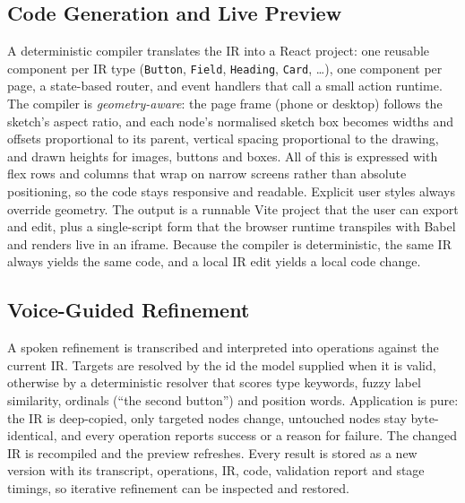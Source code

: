 \subsection{Code Generation and Live Preview}
A deterministic compiler translates the IR into a React project: one reusable component per IR type (\texttt{Button}, \texttt{Field}, \texttt{Heading}, \texttt{Card}, \dots), one component per page, a state-based router, and event handlers that call a small action runtime. The compiler is \emph{geometry-aware}: the page frame (phone or desktop) follows the sketch's aspect ratio, and each node's normalised sketch box becomes widths and offsets proportional to its parent, vertical spacing proportional to the drawing, and drawn heights for images, buttons and boxes. All of this is expressed with flex rows and columns that wrap on narrow screens rather than absolute positioning, so the code stays responsive and readable. Explicit user styles always override geometry. The output is a runnable Vite project that the user can export and edit, plus a single-script form that the browser runtime transpiles with Babel and renders live in an iframe. Because the compiler is deterministic, the same IR always yields the same code, and a local IR edit yields a local code change.

\subsection{Voice-Guided Refinement}
A spoken refinement is transcribed and interpreted into operations against the current IR. Targets are resolved by the id the model supplied when it is valid, otherwise by a deterministic resolver that scores type keywords, fuzzy label similarity, ordinals (``the second button'') and position words. Application is pure: the IR is deep-copied, only targeted nodes change, untouched nodes stay byte-identical, and every operation reports success or a reason for failure. The changed IR is recompiled and the preview refreshes. Every result is stored as a new version with its transcript, operations, IR, code, validation report and stage timings, so iterative refinement can be inspected and restored.

